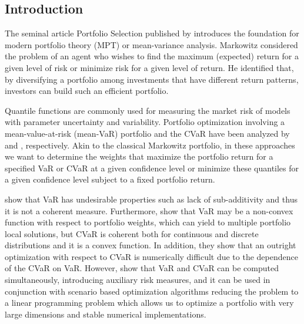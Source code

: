 \documentclass[a4paper,12pt]{report}
\begin{document}
\begin{refsection}
\section{Introduction}

\label{introduction}

The seminal article Portfolio Selection published by  \citet*{
	markowitz1952} introduces the foundation for modern portfolio theory (MPT) or mean-variance analysis. Markowitz considered the problem of an agent who wishes to find the maximum (expected) return for a given level of risk or minimize risk for a given level of return. He identified that, by diversifying a portfolio among investments
that have different return patterns, investors can build such an efficient
portfolio.

Quantile functions are commonly used for measuring the market risk of models
with parameter uncertainty and variability. Portfolio optimization involving
a mean-value-at-risk (mean-VaR) portfolio and the CVaR have been analyzed by %
\citet*{alexander2002} and \citet*{rockafellar2000}, respectively. Akin to
the classical Markowitz portfolio, in these approaches we want to determine
the weights that maximize the portfolio return for a specified VaR or CVaR
at a given confidence level or minimize these quantiles for a given
confidence level subject to a fixed portfolio return.

\citet*{artzner1999} show that VaR has undesirable properties such as lack
of sub-additivity and thus it is not a coherent measure. Furthermore, \citet*%
{uryasev2001} show that VaR may be a non-convex function with respect to
portfolio weights, which can yield to multiple portfolio local solutions,
but CVaR is coherent both for continuous and discrete distributions and it
is a convex function. In addition, they show that an outright optimization
with respect to CVaR is numerically difficult due to the dependence of the
CVaR on VaR. However, \citet*{rockafellar2000} show that VaR and CVaR can be
computed simultaneously, introducing auxiliary risk measures, and it can be
used in conjunction with scenario based optimization algorithms reducing the
problem to a linear programming problem which allows us to optimize a
portfolio with very large dimensions and stable numerical implementations.


\end{refsection}
\end{document}
